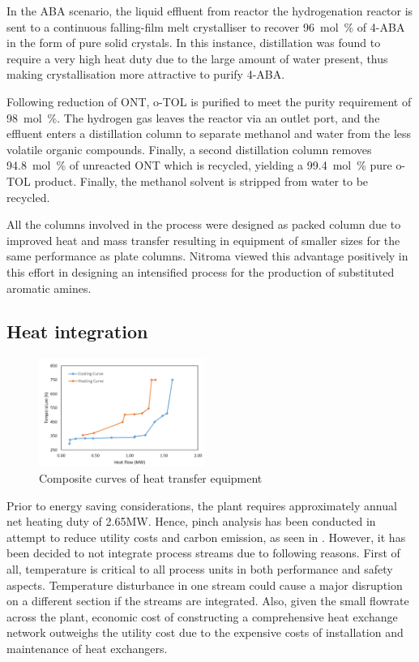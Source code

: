 In the ABA scenario, the liquid effluent from reactor the hydrogenation reactor is sent to a continuous falling-film melt crystalliser to recover \SI{96}{mol\percent} of 4-ABA in the form of pure solid crystals. In this instance, distillation was found to require a very high heat duty due to the large amount of water present, thus making crystallisation more attractive to purify 4-ABA. 

Following reduction of ONT, o-TOL is purified to meet the purity requirement of \SI{98}{mol\percent}.
The hydrogen gas leaves the reactor via an outlet port, and the effluent enters a distillation column to separate methanol and water from the less volatile organic compounds.
Finally, a second distillation column removes \SI{94.8}{mol\percent} of unreacted ONT which is recycled, yielding a \SI{99.4}{mol\percent} pure o-TOL product. Finally, the methanol solvent is stripped from water to be recycled.

All the columns involved in the process were designed as packed column due to improved heat and mass transfer resulting in equipment of smaller sizes for the same performance as plate columns. Nitroma viewed this advantage positively in this effort in designing an intensified process for the production of substituted aromatic amines.

\subsection{Heat integration}

\begin{figure}
  \begin{center}
    \includegraphics[width=0.48\textwidth]{chapters/1-synthesis/1-Figures/composite-curves.PNG}
  \end{center}
  \caption{Composite curves of heat transfer equipment}
  \label{fig:heat}
\end{figure}

Prior to energy saving considerations, the plant requires approximately annual net heating duty of 2.65MW. Hence, pinch analysis has been conducted in attempt to reduce utility costs and carbon emission, as seen in . However, it has been decided to not integrate process streams due to following reasons. First of all, temperature is critical to all process units in both performance and safety aspects. Temperature disturbance in one stream could cause a major disruption on a different section if the streams are integrated. Also, given the small flowrate across the plant, economic cost of constructing a comprehensive heat exchange network outweighs the utility cost due to the expensive costs of installation and maintenance of heat exchangers.


